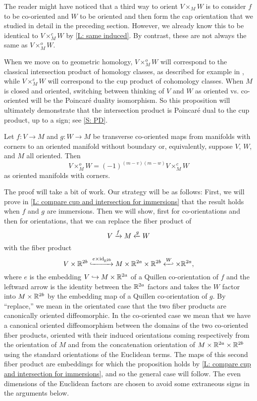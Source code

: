 The reader might have noticed that a third way to orient $V \times_M W$ is to consider $f$ to be co-oriented and $W$ to be oriented and then form the cap orientation that we studied in detail in the preceding section.
However, we already know this to be identical to $V \times_M ^cW$ by \cref{L: same induced}.
By contrast, these are not always the same as $V \times_M ^oW$.

When we move on to geometric homology, $V \times_M ^oW$ will correspond to the classical intersection product of homology classes, as described for example in \cite[Section VI.11]{Bred97}, while $V \times_M ^cW$ will correspond to the cup product of cohomology classes.
When $M$ is closed and oriented, switching between thinking of $V$ and $W$ as oriented vs.
co-oriented will be the Poincar\'e duality isomorphism.
So this proposition will ultimately demonstrate that the intersection product is Poincar\'e dual to the cup product, up to a sign; see \cref{S: PD}.

\begin{proposition}\label{P: compare cup and intersection orientations}
	Let $f \colon V \to M$ and $g \colon W \to M$ be transverse co-oriented maps from manifolds with corners to an oriented manifold without boundary or, equivalently, suppose $V$, $W$, and $M$ all oriented.
	Then $$V \times_M ^oW = (-1)^{(m-v)(m-w)} V \times_M ^cW$$ as oriented manifolds with corners.
\end{proposition}

The proof will take a bit of work.
Our strategy will be as follows: First, we will prove in \cref{L: compare cup and intersection for immersions} that the result holds when $f$ and $g$ are immersions.
Then we will show, first for co-orientations and then for orientations, that we can replace the fiber product of
$$V \xrightarrow{f} M \xleftarrow{g} W$$ with the fiber product
$$V \times \R^{2b}\xhookrightarrow{e \times \id_{\R^{2b}}} M \times \R^{2a} \times \R^{2b} \xhookleftarrow W \times \R^{2a},$$
where $e$ is the embedding $V \hookrightarrow M \times \mathbb{R}^{2a}$ of a Quillen co-orientation of $f$ and the leftward arrow is the identity between the $\mathbb{R}^{2a}$ factors and takes the $W$ factor into $M \times \mathbb{R}^{2b}$ by the embedding map of a Quillen co-orientation of $g$.
By ``replace,'' we mean in the orientated case that the two fiber products are canonically oriented diffeomorphic.
In the co-oriented case we mean that we have a canonical oriented diffeomorphism
between the domains of the two co-oriented fiber products, oriented with their induced orientations coming respectively from the orientation of $M$ and from the concatenation orientation of $M \times \mathbb{R}^{2a} \times \mathbb{R}^{2b}$ using the standard orientations of the Euclidean terms.
The maps of this second fiber product are embeddings for which the proposition holds by \cref{L: compare cup and intersection for immersions}, and so the general case will follow.
The even dimensions of the Euclidean factors are chosen to avoid some extraneous signs in the arguments below.

